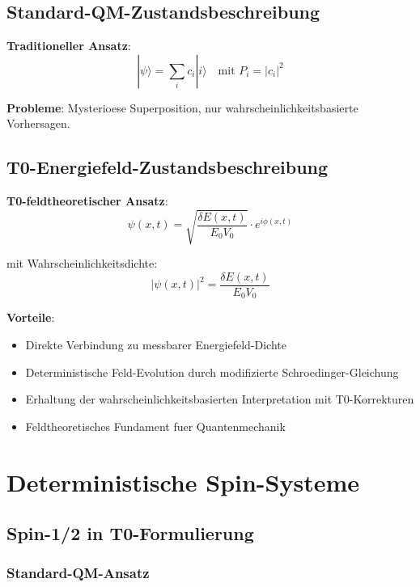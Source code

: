 \documentclass[12pt,a4paper]{article}
\begin{document}
	\subsection{Standard-QM-Zustandsbeschreibung}
	
	\textbf{Traditioneller Ansatz}:
	\begin{equation}
		|\psi\rangle = \sum_i c_i |i\rangle \quad \text{mit } P_i = |c_i|^2
	\end{equation}
	
	\textbf{Probleme}: Mysterioese Superposition, nur wahrscheinlichkeitsbasierte Vorhersagen.
	
	\subsection{T0-Energiefeld-Zustandsbeschreibung}
	
	\textbf{T0-feldtheoretischer Ansatz}:
	\begin{equation}
		\boxed{\psi(x,t) = \sqrt{\frac{\delta E(x,t)}{E_0 V_0}} \cdot e^{i\phi(x,t)}}
		\label{eq:wellenfunktion_feld}
	\end{equation}
	
	mit Wahrscheinlichkeitsdichte:
	\begin{equation}
		\boxed{|\psi(x,t)|^2 = \frac{\delta E(x,t)}{E_0 V_0}}
		\label{eq:wahrscheinlichkeitsdichte}
	\end{equation}
	
	\textbf{Vorteile}: 
	\begin{itemize}
		\item Direkte Verbindung zu messbarer Energiefeld-Dichte
		\item Deterministische Feld-Evolution durch modifizierte Schroedinger-Gleichung
		\item Erhaltung der wahrscheinlichkeitsbasierten Interpretation mit T0-Korrekturen
		\item Feldtheoretisches Fundament fuer Quantenmechanik
	\end{itemize}
	
	\section{Deterministische Spin-Systeme}
	
	\subsection{Spin-1/2 in T0-Formulierung}
	
	\subsubsection{Standard-QM-Ansatz}
	
\end{document}
